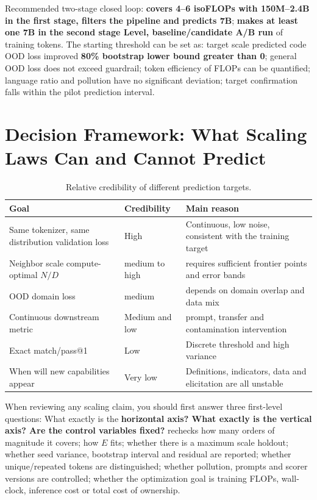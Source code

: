 \documentclass[UTF8,10pt,a4paper,fontset=none]{ctexart}
\begin{document}
Recommended two-stage closed loop: \textbf{ covers 4--6 isoFLOPs with 150M--2.4B in the first stage, filters the pipeline and predicts 7B}; \textbf{ makes at least one 7B in the second stage Level, baseline/candidate A/B run} of training tokens. The starting threshold can be set as: target scale predicted code OOD loss improved \textbf{80\% bootstrap lower bound greater than 0}; general OOD loss does not exceed guardrail; token efficiency of FLOPs can be quantified; language ratio and pollution have no significant deviation; target confirmation falls within the pilot prediction interval.

\section{Decision Framework: What Scaling Laws Can and Cannot Predict}

\begin{table}[htbp]
\centering
\caption{Relative credibility of different prediction targets.}
\label{en:tab:predictability}
\begin{tabularx}{\textwidth}{Y C{2.0cm} Y}
\toprule
Goal & Credibility & Main reason \\
\midrule
Same tokenizer, same distribution validation loss & High & Continuous, low noise, consistent with the training target \\
Neighbor scale compute-optimal $N/D$ & medium to high & requires sufficient frontier points and error bands \\
OOD domain loss & medium & depends on domain overlap and data mix \\
Continuous downstream metric & Medium and low & prompt, transfer and contamination intervention \\
Exact match/pass@1 & Low & Discrete threshold and high variance \\
When will new capabilities appear & Very low & Definitions, indicators, data and elicitation are all unstable \\
\bottomrule
\end{tabularx}
\end{table}

When reviewing any scaling claim, you should first answer three first-level questions: What exactly is the \textbf{ horizontal axis? What exactly is the vertical axis? Are the control variables fixed? } rechecks how many orders of magnitude it covers; how $E$ fits; whether there is a maximum scale holdout; whether seed variance, bootstrap interval and residual are reported; whether unique/repeated tokens are distinguished; whether pollution, prompts and scorer versions are controlled; whether the optimization goal is training FLOPs, wall-clock, inference cost or total cost of ownership.
\end{document}
